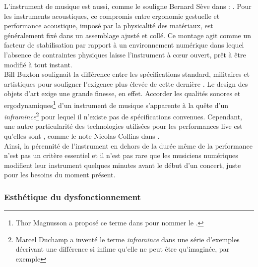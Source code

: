\noindent L'instrument de musique est aussi, comme le souligne Bernard Sève dans \cite{seve_instrument_2013} : . Pour les instruments acoustiques, ce compromis entre ergonomie gestuelle et performance acoustique, imposé par la physicalité des matériaux, est généralement fixé dans un assemblage ajusté et collé. Ce montage agit comme un facteur de stabilisation par rapport à un environnement numérique dans lequel l'absence de contraintes physiques laisse l'instrument à cœur ouvert, prêt à être modifié à tout instant.\\
\indent Bill Buxton soulignait la différence entre les spécifications standard, militaires et artistiques pour souligner l'exigence plus élevée de cette dernière \cite{buxton_artists_1997}. Le design des objets d'art exige une grande finesse, en effet. Accorder les qualités sonores et ergodynamiques\footnote{Thor Magnusson a proposé ce terme dans \cite{magnusson_ergodynamics_2019} pour nommer le .} d'un instrument de musique s'apparente à la quête d'un \textit{inframince}\footnote{\label{fn:inframince}Marcel Duchamp \cite{duchamp_notes_2008} a inventé le terme \textit{inframince} dans une série d'exemples décrivant une différence si infime qu'elle ne peut être qu'imaginée, par exemple } pour lequel il n'existe pas de spécifications convenues. Cependant, une autre particularité des technologies utilisées pour les performances live est qu'elles sont , comme le note Nicolas Collins dans \cite{collins_semiconducting_2013}.\\
\indent Ainsi, la pérennité de l'instrument en dehors de la durée même de la performance n'est pas un critère essentiel et il n'est pas rare que les musiciens numériques modifient leur instrument quelques minutes avant le début d'un concert, juste pour les besoins du moment présent.

	
\subsubsection{Esthétique du dysfonctionnement}


